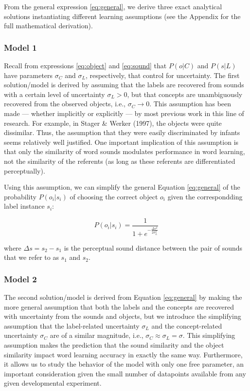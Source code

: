 \documentclass[english,,man]{apa6}
\begin{document}
From the general expression \ref{eq:general}, we derive three exact analytical solutions instantiating different learning assumptions (see the Appendix for the full mathematical derivation).

\hypertarget{model-1}{%
\subsubsection{Model 1}\label{model-1}}

Recall from expressions \ref{eq:object} and \ref{eq:sound} that \(P(o|C)\) and \(P(s|L)\) have parameters \(\sigma_C\) and \(\sigma_L\), respectively, that control for uncertainty. The first solution/model is derived by assuming that the labels are recovered from sounds with a certain level of uncertainty \(\sigma_L > 0\), but that concepts are unambiguously recovered from the observed objects, i.e., \(\sigma_C \rightarrow 0\). This assumption has been made --- whether implicitly or explicitly --- by most previous work in this line of research. For example, in Stager \& Werker (1997), the objects were quite dissimilar. Thus, the assumption that they were easily discriminated by infants seems relatively well justified. One important implication of this assumption is that only the similarity of word sounds modulates performance in word learning, not the similarity of the referents (as long as these referents are differentiated perceptually).

Using this assumption, we can simplify the general Equation \ref{eq:general} of the probability \(P(o_i | s_i)\) of choosing the correct object \(o_i\) given the correspondding label instance \(s_i\):

\begin{equation} \label{eq:model1}
P(o_i|s_i)= \frac{1}{1 + e^{-\frac{\Delta s^2}{2\sigma_L^2}}}
\end{equation}

where \(\Delta s = s_2-s_1\) is the perceptual sound distance between the pair of sounds that we refer to as \(s_1\) and \(s_2\).

\hypertarget{model-2}{%
\subsubsection{Model 2}\label{model-2}}

The second solution/model is derived from Equation \ref{eq:general} by making the more general assumption that both the labels and the concepts are recovered with uncertainty from the sounds and objects, but we introduce the simplifying assumption that the label-related uncertainty \(\sigma_L\) and the concept-related uncertainty \(\sigma_C\) are of a similar magnitude, i.e., \(\sigma_C \approx \sigma_L = \sigma\). This simplifying assumption makes the prediction that the sound similarity and the object similarity impact word learning accuracy in exactly the same way. Furthermore, it allows us to study the behavior of the model with only one free parameter, an important consideration given the small number of datapoints available from any given developmental experiment.
\end{document}
